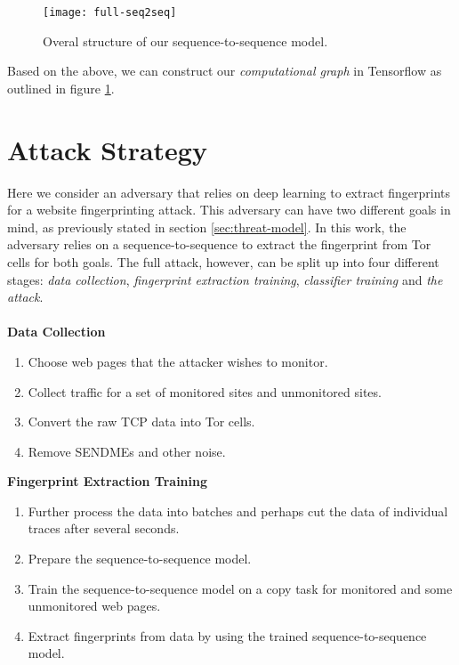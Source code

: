\begin{figure}[ht]
  \centering
  \texttt{[image: full-seq2seq]}
  \caption{Overal structure of our sequence-to-sequence model.}
  \label{fig:full-seq2seq}
\end{figure}

Based on the above, we can construct our \textit{computational graph} in Tensorflow as outlined in figure \ref{fig:full-seq2seq}.

\section{Attack Strategy}

Here we consider an adversary that relies on deep learning to extract fingerprints for a website fingerprinting attack.
This adversary can have two different goals in mind, as previously stated in section \ref{sec:threat-model}.
In this work, the adversary relies on a sequence-to-sequence to extract the fingerprint from Tor cells for both goals.
The full attack, however, can be split up into four different stages: \textit{data collection}, \textit{fingerprint extraction training}, \textit{classifier training} and \textit{the attack}.
\\\\
\noindent
\textbf{Data Collection}
\begin{enumerate}
  \item Choose web pages that the attacker wishes to monitor.
  \item Collect traffic for a set of monitored sites and unmonitored sites.
  \item Convert the raw TCP data into Tor cells.
  \item Remove SENDMEs and other noise.
\end{enumerate}

\noindent
\textbf{Fingerprint Extraction Training}
\begin{enumerate}[resume]
  \item Further process the data into batches and perhaps cut the data of individual traces after several seconds.
  \item Prepare the sequence-to-sequence model.
  \item Train the sequence-to-sequence model on a copy task for monitored and some unmonitored web pages.
  \item Extract fingerprints from data by using the trained sequence-to-sequence model.
\end{enumerate}

